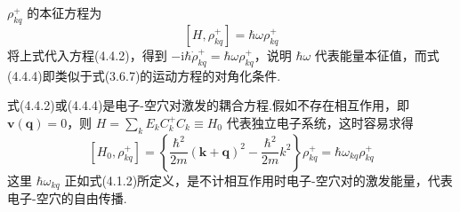 $\rho_{kq}^{+}$ 的本征方程为
\begin{equation}
  \left[H,\rho_{kq}^{+}\right]=\hbar\omega\rho_{kq}^{+}
\end{equation}
将上式代入方程(4.4.2)，得到 $-\mathrm{i}\hbar\dot{\rho}_{kq}^{+}=\hbar\omega\rho_{kq}^{+}$，说明 $\hbar\omega$ 代表能量本征值，而式(4.4.4)即类似于式(3.6.7)的运动方程的对角化条件.

式(4.4.2)或(4.4.4)是电子-空穴对激发的耦合方程.假如不存在相互作用，即 $\boldsymbol{v}(\boldsymbol{q})=0$，则 $H=\displaystyle\sum_{k}E_{k}C_{k}^{+}C_{k}\equiv H_{0}$ 代表独立电子系统，这时容易求得
\begin{equation}
  \left[H_{0},\rho_{kq}^{+}\right]
  =\left\{\frac{\hbar^{2}}{2m}(\boldsymbol{k}+\boldsymbol{q})^{2}
  -\frac{\hbar^{2}}{2m}k^{2}\right\}\rho_{kq}^{+}
  =\hbar\omega_{kq}\rho_{kq}^{+}
\end{equation}
这里 $\hbar\omega_{kq}$ 正如式(4.1.2)所定义，是不计相互作用时电子-空穴对的激发能量，代表电子-空穴的自由传播.

